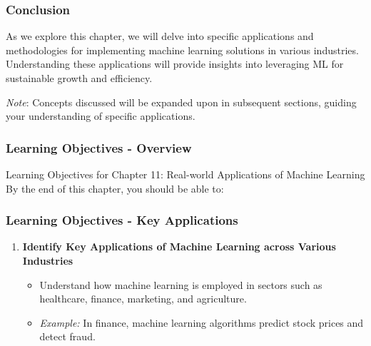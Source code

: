 \documentclass{beamer}
\begin{document}
\begin{frame}[fragile]
    \frametitle{Conclusion}
    As we explore this chapter, we will delve into specific applications and methodologies for implementing machine learning solutions in various industries. Understanding these applications will provide insights into leveraging ML for sustainable growth and efficiency.

    \textit{Note}: Concepts discussed will be expanded upon in subsequent sections, guiding your understanding of specific applications.
\end{frame}

\begin{frame}[fragile]
    \frametitle{Learning Objectives - Overview}
    \begin{block}{Learning Objectives for Chapter 11: Real-world Applications of Machine Learning}
        By the end of this chapter, you should be able to:
    \end{block}
\end{frame}

\begin{frame}[fragile]
    \frametitle{Learning Objectives - Key Applications}
    \begin{enumerate}
        \item \textbf{Identify Key Applications of Machine Learning across Various Industries}
        \begin{itemize}
            \item Understand how machine learning is employed in sectors such as healthcare, finance, marketing, and agriculture.
            \item \textit{Example:} In finance, machine learning algorithms predict stock prices and detect fraud.
        \end{itemize}
    \end{enumerate}
\end{frame}
\end{document}
